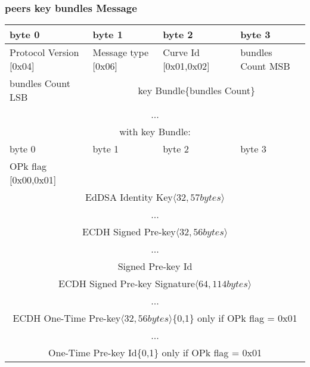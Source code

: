 \documentclass[a4paper,11pt]{article}
\begin{document}
    \subsubsection{peers key bundles Message}
      \begin{center}
      \begin{tabular}{ | p{1.4in} | p{1.4in} | p{1.4in} | p{1.4in} |}
        \hline
        \cellcolor[gray]{0.85} byte 0 & \cellcolor[gray]{0.85} byte 1 & \cellcolor[gray]{0.85} byte 2 & \cellcolor[gray]{0.85}byte 3\\
        \hline
        Protocol Version [0x04] & Message type [0x06] & Curve Id [0x01,0x02] & bundles Count MSB\\
        \hline
        bundles Count LSB & \multicolumn{3}{|c|}{key Bundle\{bundles Count\}}\\
        \cline{1-1}
        \multicolumn{4}{|c|}{...}\\
        \hline
        \multicolumn{4}{c}{with key Bundle:}\\
        \hline
        \cellcolor[gray]{0.95} byte 0 & \cellcolor[gray]{0.95} byte 1 & \cellcolor[gray]{0.95} byte 2 & \cellcolor[gray]{0.95}byte 3\\
        \hline
        OPk flag [0x00,0x01] & \multicolumn{3}{|c|}{}\\
        \cline{1-1}
        \multicolumn{4}{|c|}{EdDSA Identity Key$\langle 32,57bytes\rangle $}\\
        \multicolumn{4}{|c|}{...}\\
        \hline
        \multicolumn{4}{|c|}{ECDH Signed Pre-key$\langle 32,56bytes\rangle $}\\
        \multicolumn{4}{|c|}{...}\\
        \hline
        \multicolumn{4}{|c|}{Signed Pre-key Id}\\
        \hline
        \multicolumn{4}{|c|}{ECDH Signed Pre-key Signature$\langle 64,114bytes\rangle $}\\
        \multicolumn{4}{|c|}{...}\\
        \hline
        \multicolumn{4}{|c|}{ECDH One-Time Pre-key$\langle 32,56bytes\rangle $\{0,1\} only if OPk flag = 0x01}\\
        \multicolumn{4}{|c|}{...}\\
        \hline
        \multicolumn{4}{|c|}{One-Time Pre-key Id\{0,1\} only if OPk flag = 0x01}\\
        \hline
      \end{tabular}
      \end{center}
      
\end{document}
